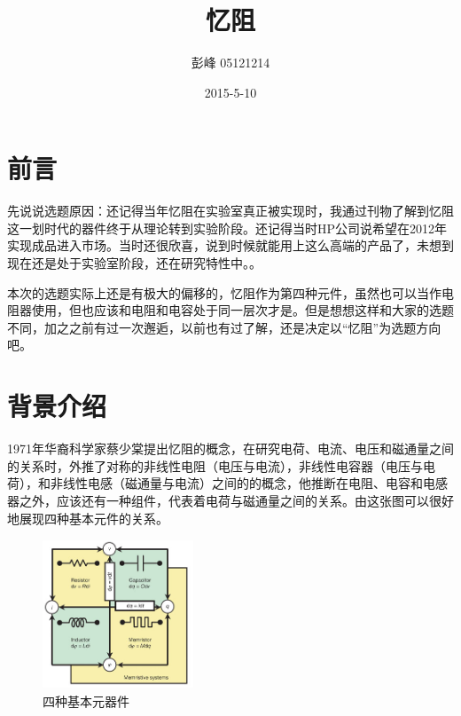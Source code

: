 \documentclass[UTF8]{article}
\begin{document}
 



\renewcommand{\contentsname}{\center{\huge 目\ \ \ 录}}
\author{    彭峰     05121214   }
 \date{2015-5-10}
\title{忆阻}  %
\titlelabel{\S\thetitle\quad}

\tableofcontents

\maketitle

\section{前言}

先说说选题原因：还记得当年忆阻在实验室真正被实现时，我通过刊物了解到忆阻这一划时代的器件终于从理论转到实验阶段。还记得当时HP公司说希望在2012年实现成品进入市场。当时还很欣喜，说到时候就能用上这么高端的产品了，未想到现在还是处于实验室阶段，还在研究特性中。。

本次的选题实际上还是有极大的偏移的，忆阻作为第四种元件，虽然也可以当作电阻器使用，但也应该和电阻和电容处于同一层次才是。但是想想这样和大家的选题不同，加之之前有过一次邂逅，以前也有过了解，还是决定以“忆阻”为选题方向吧。

\section{背景介绍}
1971年华裔科学家蔡少棠提出忆阻的概念，在研究电荷、电流、电压和磁通量之间的关系时，外推了对称的非线性电阻（电压与电流），非线性电容器（电压与电荷），和非线性电感（磁通量与电流）之间的的概念，他推断在电阻、电容和电感器之外，应该还有一种组件，代表着电荷与磁通量之间的关系。由这张图可以很好地展现四种基本元件的关系。

\begin{figure}[htbp]
\centering
\includegraphics[width=1.77in,height=1.75in]{pic/memristor01.jpeg}
\caption{四种基本元器件}
\label{fig:graph}
\end{figure}
\end{document}
